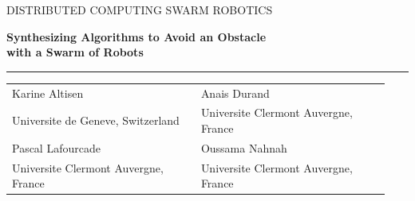 \begin{frame}[plain]
  \vspace{0.2cm}
  {\scriptsize\textcolor{softgray}{DISTRIBUTED COMPUTING \textperiodcentered{} SWARM ROBOTICS}}
  \vspace{0.6cm}

  {\LARGE\textbf{Synthesizing Algorithms to Avoid an Obstacle}\\[0.1cm]
  \textcolor{accent}{\LARGE\textbf{with a Swarm of Robots}}}

  \vspace{0.4cm}
  {\color{accent}\rule{1.8cm}{1.2pt}}

  \vfill
  \begin{tabular}{>{\raggedright\arraybackslash}p{0.47\linewidth} >{\raggedright\arraybackslash}p{0.47\linewidth}}
    Karine Altisen & Anais Durand \\
    \scriptsize Universite de Geneve, Switzerland & \scriptsize Universite Clermont Auvergne, France \\
    Pascal Lafourcade & Oussama Nahnah \\
    \scriptsize Universite Clermont Auvergne, France & \scriptsize Universite Clermont Auvergne, France
  \end{tabular}
\end{frame}
